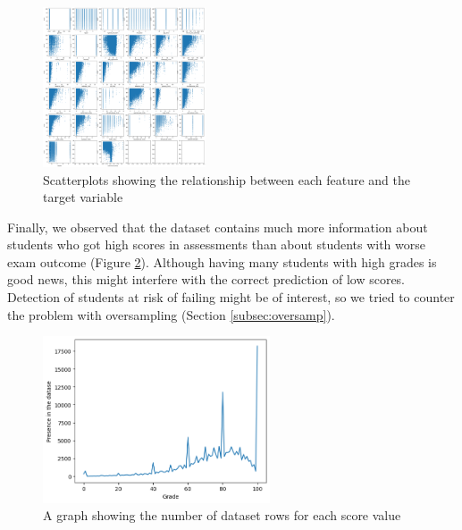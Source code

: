 \documentclass{article}
\begin{document}
\begin{figure}[h!]
\centering
\includegraphics[width=0.43\textwidth]{scatterplots.png}
\caption{\label{fig:scatt}Scatterplots showing the relationship between each feature and the target variable}
\end{figure}

Finally, we observed that the dataset contains much more information about students who got high scores in assessments than about students with worse exam outcome (Figure \ref{fig:misrepr}). Although having many students with high grades is good news, this might interfere with the correct prediction of low scores. Detection of students at risk of failing might be of interest, so we tried to counter the problem with oversampling (Section \ref{subsec:oversamp}).

\begin{figure}[h!]
\centering
\includegraphics[width=0.6\textwidth]{misrepr.png}
\caption{\label{fig:misrepr}A graph showing the number of dataset rows for each score value}
\end{figure}
\end{document}
